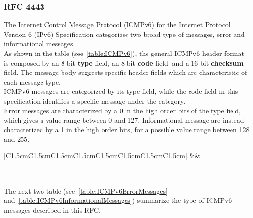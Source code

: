 \documentclass[12pt]{article}
\begin{document}
\subsubsection{RFC 4443}
\label{subsub:4443}

The Internet Control Message Protocol (ICMPv6) for the Internet Protocol Version 6 (IPv6) Specification categorizes two broad type of messages, error and informational messages.\\
As shown in the table (see~\ref{table:ICMPv6}), the general ICMPv6 header format is composed by an 8 bit \textbf{type} field, an 8 bit \textbf{code} field, and a 16 bit \textbf{checksum} field. The message body suggests 
specific header fields which are characteristic of each message type.\\
ICMPv6 messages are categorized by its type field, while the code field in this specification identifies a specific message under the category.\\
Error messages are characterized by a 0 in the high order bits of the type field, which gives a value range between 0 and 127. Informational message are instead characterized by a 1 in the high order bits, for a possible 
value range between 128 and 255.\\

\begin{savenotes}
\begin{table}[h]
\centering
\begin{tabular}{|C{1.5cm}C{1.5cm}C{1.5cm}C{1.5cm}C{1.5cm}C{1.5cm}C{1.5cm}C{1.5cm}|}
\hline
{}&&\\
\hline
{}
\\
\\
\hdashline
\end{tabular}
\caption{ICMPv6 General Header Format}
\label{table:ICMPv6}
\end{table}
\end{savenotes}

The next two table (see~\ref{table:ICMPv6ErrorMessages} and~\ref{table:ICMPv6InformationalMessages}) summarize the type of ICMPv6 messages described in this RFC.\\
\end{document}
